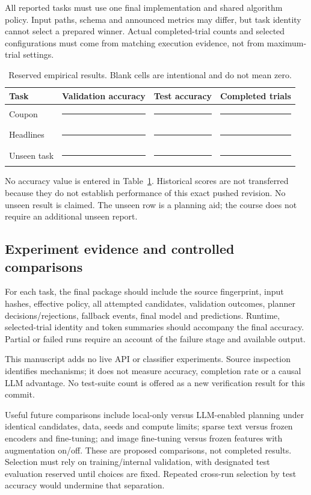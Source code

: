 \documentclass[11pt,a4paper]{article}
\newcommand{\resultblank}{\rule{15mm}{0.35pt}}
\begin{document}
All reported tasks must use one final implementation and shared algorithm policy. Input paths, schema and announced metrics may differ, but task identity cannot select a prepared winner. Actual completed-trial counts and selected configurations must come from matching execution evidence, not from maximum-trial settings.
\begin{table}[ht]\centering
\caption{Reserved empirical results. Blank cells are intentional and do not mean zero.}\label{tab:results}
\begin{tabular}{lccc}\toprule Task & Validation accuracy & Test accuracy & Completed trials\\\midrule
Coupon & \resultblank & \resultblank & \resultblank\\[5pt]
Headlines & \resultblank & \resultblank & \resultblank\\[5pt]
Unseen task & \resultblank & \resultblank & \resultblank\\\bottomrule\end{tabular}
\end{table}

No accuracy value is entered in Table~\ref{tab:results}. Historical scores are not transferred because they do not establish performance of this exact pushed revision. No unseen result is claimed. The unseen row is a planning aid; the course does not require an additional unseen report.

\subsection{Experiment evidence and controlled comparisons}
For each task, the final package should include the source fingerprint, input hashes, effective policy, all attempted candidates, validation outcomes, planner decisions/rejections, fallback events, final model and predictions. Runtime, selected-trial identity and token summaries should accompany the final accuracy. Partial or failed runs require an account of the failure stage and available output.

This manuscript adds no live API or classifier experiments. Source inspection identifies mechanisms; it does not measure accuracy, completion rate or a causal LLM advantage. No test-suite count is offered as a new verification result for this commit.

Useful future comparisons include local-only versus LLM-enabled planning under identical candidates, data, seeds and compute limits; sparse text versus frozen encoders and fine-tuning; and image fine-tuning versus frozen features with augmentation on/off. These are proposed comparisons, not completed results. Selection must rely on training/internal validation, with designated test evaluation reserved until choices are fixed. Repeated cross-run selection by test accuracy would undermine that separation.
\end{document}

